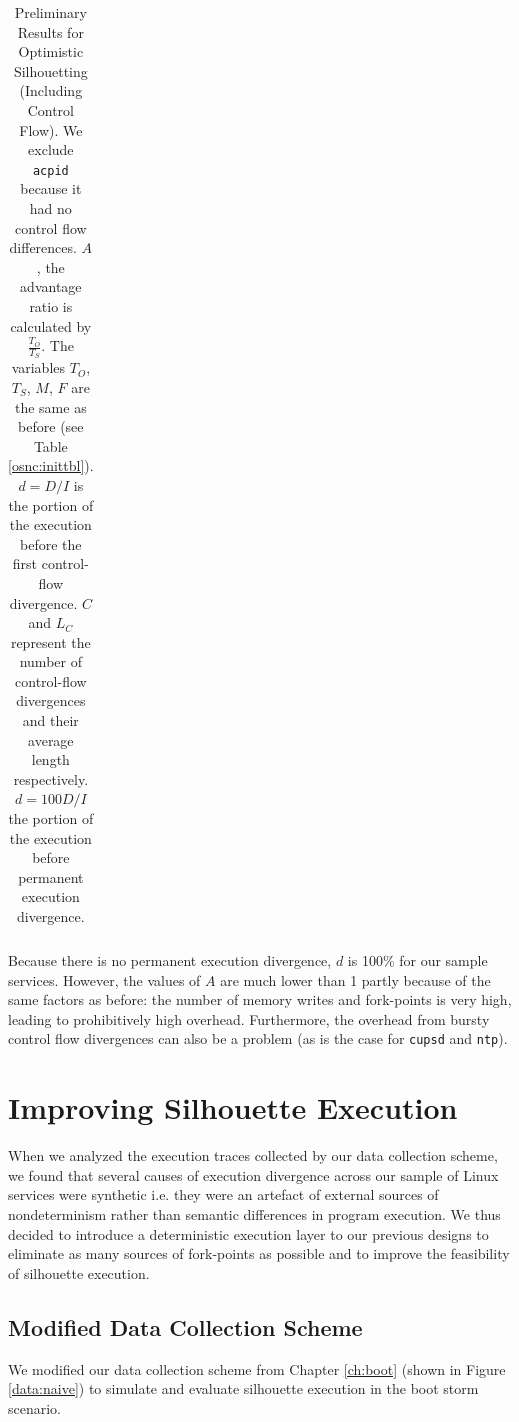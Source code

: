 \begin{table} [h]
\begin{adjustwidth}{-1cm}{}
\begin{tabular}{|l||c|c||c||c|c|c|c|c||c||c|}
  \end{tabular}
\end{adjustwidth}

\caption{Preliminary Results for Optimistic Silhouetting (Including Control Flow). \newline 
  We exclude \texttt{acpid} because it had no control flow differences.
  $A$, the advantage ratio is calculated by $\frac{T_O}{T_S}$.
  The variables $T_O$, $T_S$, $M$, $F$ are the same as before (see Table \ref{osnc:inittbl}). 
  $d = D/I$ is the portion of the execution before the first control-flow divergence. 
  $C$ and $L_C$ represent the number of control-flow divergences and their average length
  respectively.  $d = 100D/I$  the portion of the execution before permanent execution divergence. }
\label{osc:inittbl}

\end{table}

\noindent Because there is no permanent execution divergence, $d$ is 100\%
for our sample services. However, the values of $A$ are much lower than 1
partly because of the same factors as before: the number
of memory writes and fork-points is very high,
leading to prohibitively high overhead. Furthermore,
the overhead from bursty control flow divergences 
can also be a problem (as is the case for \texttt{cupsd} and
\texttt{ntp}).

\newpage
\section{Improving Silhouette Execution} \label{silimprove}
When we analyzed the execution
traces collected by our data collection scheme,
we found that several causes of execution
divergence across our sample
of Linux services were synthetic i.e. they were an artefact
of external sources of nondeterminism
rather than semantic differences in program execution.
We thus decided to introduce a deterministic
execution layer to our previous
designs to eliminate as many sources of 
fork-points as possible and to 
improve the feasibility
of silhouette execution.

\subsection{Modified Data Collection Scheme}
We modified our data collection scheme from Chapter \ref{ch:boot} 
(shown in Figure \ref{data:naive}) to simulate and
evaluate silhouette execution in the boot storm scenario.

